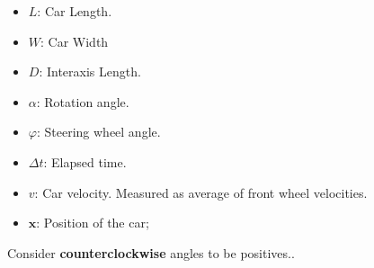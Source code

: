 \documentclass[a4paper]{article}
\begin{document}
\begin{multicols}{2}
\begin{center}
\begin{tikzpicture}[x=1\unitlength,y=1\unitlength]
	\end{tikzpicture}\end{center}
\begin{itemize}
	\item $L$: Car Length.
	\item $W$: Car Width
	\item $D$: Interaxis Length.
	\item $\alpha$: Rotation angle.
	\item $\varphi$: Steering wheel angle.
	\item $\Delta t$: Elapsed time.
	\item $v$: Car velocity. Measured as average of front wheel velocities.
	\item $\mathbf{x}$: Position of the car;
\end{itemize}
\end{multicols}

Consider \textbf{counterclockwise} angles to be positives..
\end{document}
